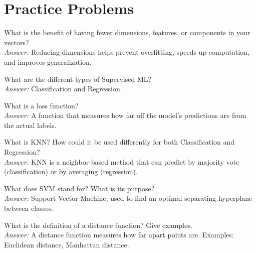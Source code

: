 \section{Practice Problems}
\begin{outline}[enumerate]
    \1 What is the benefit of having fewer dimensions, features, or components in your vectors? \\
    \textit{Answer:} Reducing dimensions helps prevent overfitting, speeds up computation, and improves generalization.
    
    \1 What are the different types of Supervised ML? \\
    \textit{Answer:} Classification and Regression.
    
    \1 What is a loss function? \\
    \textit{Answer:} A function that measures how far off the model’s predictions are from the actual labels.
    
    \1 What is KNN? How could it be used differently for both Classification and Regression? \\
    \textit{Answer:} KNN is a neighbor-based method that can predict by majority vote (classification) or by averaging (regression).
    
    \1 What does SVM stand for? What is its purpose? \\
    \textit{Answer:} Support Vector Machine; used to find an optimal separating hyperplane between classes.
    
    \1 What is the definition of a distance function? Give examples. \\
    \textit{Answer:} A distance function measures how far apart points are. Examples: Euclidean distance, Manhattan distance.
\end{outline}



